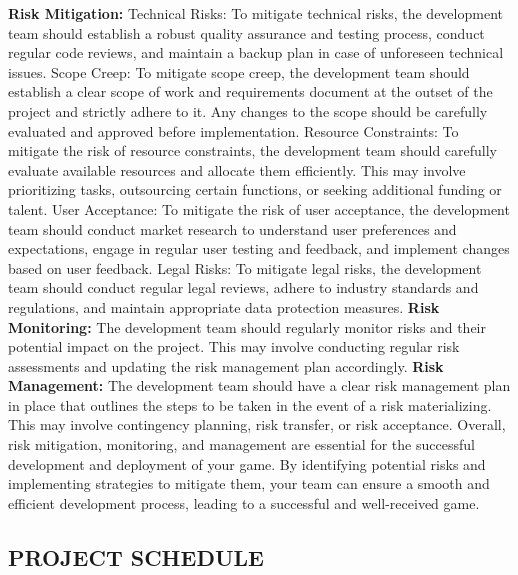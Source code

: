 \documentclass[12pt]{report}
\begin{document}
\normalsize
\textbf{Risk Mitigation:} \newline
Technical Risks: To mitigate technical risks, the development team should establish a robust quality assurance and testing process, conduct regular code reviews, and maintain a backup plan in case of unforeseen technical issues.
Scope Creep: To mitigate scope creep, the development team should establish a clear scope of work and requirements document at the outset of the project and strictly adhere to it. Any changes to the scope should be carefully evaluated and approved before implementation.
Resource Constraints: To mitigate the risk of resource constraints, the development team should carefully evaluate available resources and allocate them efficiently. This may involve prioritizing tasks, outsourcing certain functions, or seeking additional funding or talent.
User Acceptance: To mitigate the risk of user acceptance, the development team should conduct market research to understand user preferences and expectations, engage in regular user testing and feedback, and implement changes based on user feedback.
Legal Risks: To mitigate legal risks, the development team should conduct regular legal reviews, adhere to industry standards and regulations, and maintain appropriate data protection measures.\newline
\textbf{Risk Monitoring:}\newline
The development team should regularly monitor risks and their potential impact on the project. This may involve conducting regular risk assessments and updating the risk management plan accordingly.\newline
\textbf{Risk Management:}\newline
The development team should have a clear risk management plan in place that outlines the steps to be taken in the event of a risk materializing. This may involve contingency planning, risk transfer, or risk acceptance.
Overall, risk mitigation, monitoring, and management are essential for the successful development and deployment of your game. By identifying potential risks and implementing strategies to mitigate them, your team can ensure a smooth and efficient development process, leading to a successful and well-received game.


\subsection{PROJECT SCHEDULE}
\end{document}
